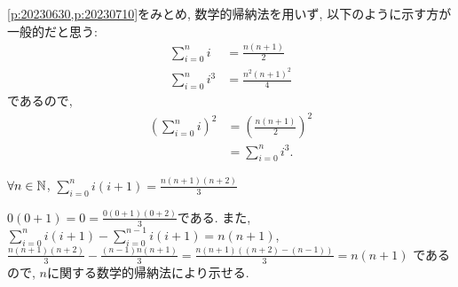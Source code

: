 \begin{rem}
  \cref{p:20230630,p:20230710}をみとめ,
  数学的帰納法を用いず, 以下のように示す方が一般的だと思う:
  \begin{align*}
    \sum_{i=0}^{n} i&=\frac{n(n+1)}{2}\\
    \sum_{i=0}^{n}i^3&=\frac{n^2(n+1)^2}{4}
  \end{align*}
  であるので,
  \begin{align*}
    \left(\sum_{i=0}^{n} i\right)^2&=\left(\frac{n(n+1)}{2}\right)^2\\
    &=\sum_{i=0}^{n}i^3.
  \end{align*}
\end{rem}


\begin{prop}
  \label{p:20230716}
  $\forall n\in\mathbb{N}$, $\sum_{i=0}^n i(i+1)=\frac{n(n+1)(n+2)}{3}$
\end{prop}
\begin{proof**}
  $0(0+1)=0=\frac{0(0+1)(0+2)}{3}$である.
  また,
  $\sum_{i=0}^n i(i+1)-\sum_{i=0}^{n-1} i(i+1)=n(n+1)$,
  $\frac{n(n+1)(n+2)}{3}-\frac{(n-1)n(n+1)}{3}=\frac{n(n+1)((n+2)-(n-1))}{3}=n(n+1)$
  であるので,
  $n$に関する数学的帰納法により示せる.
\end{proof**}

